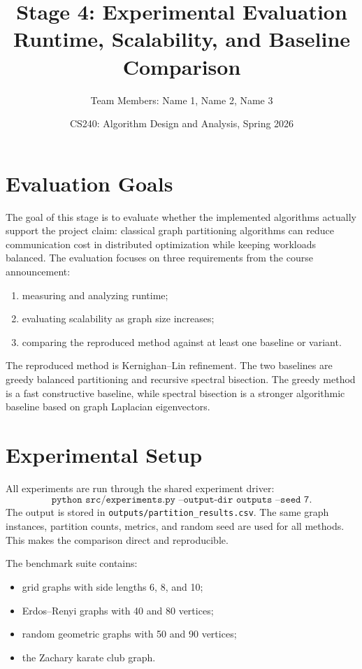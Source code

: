 \documentclass[11pt]{article}
\title{\textbf{Stage 4: Experimental Evaluation}\\
Runtime, Scalability, and Baseline Comparison}
\author{Team Members: Name 1, Name 2, Name 3}
\date{CS240: Algorithm Design and Analysis, Spring 2026}
\begin{document}
\maketitle

\section{Evaluation Goals}

The goal of this stage is to evaluate whether the implemented algorithms
actually support the project claim: classical graph partitioning algorithms can
reduce communication cost in distributed optimization while keeping workloads
balanced. The evaluation focuses on three requirements from the course
announcement:
\begin{enumerate}
    \item measuring and analyzing runtime;
    \item evaluating scalability as graph size increases;
    \item comparing the reproduced method against at least one baseline or
    variant.
\end{enumerate}

The reproduced method is Kernighan--Lin refinement. The two baselines are
greedy balanced partitioning and recursive spectral bisection. The greedy
method is a fast constructive baseline, while spectral bisection is a stronger
algorithmic baseline based on graph Laplacian eigenvectors.

\section{Experimental Setup}

All experiments are run through the shared experiment driver:
\[
\texttt{python src/experiments.py --output-dir outputs --seed 7}.
\]
The output is stored in \texttt{outputs/partition\_results.csv}. The same graph
instances, partition counts, metrics, and random seed are used for all methods.
This makes the comparison direct and reproducible.

The benchmark suite contains:
\begin{itemize}
    \item grid graphs with side lengths 6, 8, and 10;
    \item Erdos--Renyi graphs with 40 and 80 vertices;
    \item random geometric graphs with 50 and 90 vertices;
    \item the Zachary karate club graph.
\end{itemize}
\end{document}

